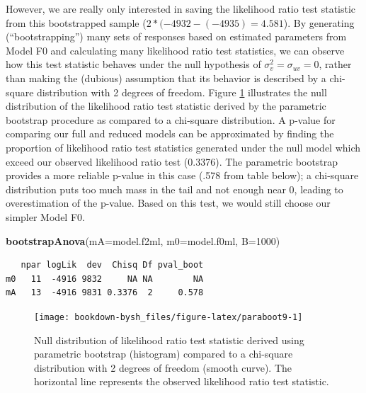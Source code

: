 \documentclass[
]{krantz}
\newenvironment{Shaded}{\begin{snugshade}}{\end{snugshade}}
\newcommand{\DataTypeTok}[1]{\textcolor[rgb]{0.27,0.27,0.27}{#1}}
\newcommand{\DecValTok}[1]{\textcolor[rgb]{0.06,0.06,0.06}{#1}}
\newcommand{\KeywordTok}[1]{\textcolor[rgb]{0.27,0.27,0.27}{\textbf{#1}}}
\newcommand{\NormalTok}[1]{#1}
\begin{document}
However, we are really only interested in saving the likelihood ratio test statistic from this bootstrapped sample (\(2*(-4932 - (-4935) = 4.581\)). By generating (``bootstrapping'') many sets of responses based on estimated parameters from Model F0 and calculating many likelihood ratio test statistics, we can observe how this test statistic behaves under the null hypothesis of \(\sigma_{v}^{2} = \sigma_{uv} = 0\), rather than making the (dubious) assumption that its behavior is described by a chi-square distribution with 2 degrees of freedom. Figure \ref{fig:paraboot9} illustrates the null distribution of the likelihood ratio test statistic derived by the parametric bootstrap procedure as compared to a chi-square distribution. A p-value for comparing our full and reduced models can be approximated by finding the proportion of likelihood ratio test statistics generated under the null model which exceed our observed likelihood ratio test (0.3376). The parametric bootstrap provides a more reliable p-value in this case (.578 from table below); a chi-square distribution puts too much mass in the tail and not enough near 0, leading to overestimation of the p-value. Based on this test, we would still choose our simpler Model F0.

\begin{Shaded}
\begin{Highlighting}[]
\KeywordTok{bootstrapAnova}\NormalTok{(}\DataTypeTok{mA=}\NormalTok{model.f2ml, }\DataTypeTok{m0=}\NormalTok{model.f0ml, }\DataTypeTok{B=}\DecValTok{1000}\NormalTok{)}
\end{Highlighting}
\end{Shaded}

\begin{verbatim}
   npar logLik  dev  Chisq Df pval_boot
m0   11  -4916 9832     NA NA        NA
mA   13  -4916 9831 0.3376  2     0.578
\end{verbatim}

\begin{figure}

{\centering \texttt{[image: bookdown-bysh\_files/figure-latex/paraboot9-1]} 

}

\caption{Null distribution of likelihood ratio test statistic derived using parametric bootstrap (histogram) compared to a chi-square distribution with 2 degrees of freedom (smooth curve).  The horizontal line represents the observed likelihood ratio test statistic.}\label{fig:paraboot9}
\end{figure}
\end{document}
